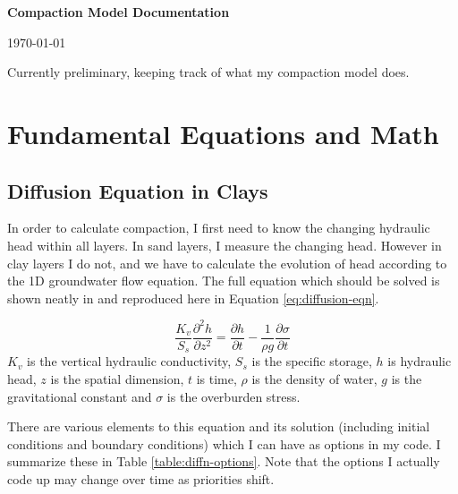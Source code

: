 \documentclass{article}
\begin{document}
\LARGE\textbf{Compaction Model Documentation}
\normalsize

\today
\author{Matt Lees}

\abstract Currently preliminary, keeping track of what my compaction model does.


\tableofcontents

\section{Fundamental Equations and Math}

\subsection{Diffusion Equation in Clays}
\label{sec:diffusion}

In order to calculate compaction, I first need to know the changing hydraulic head within all layers. In sand layers, I measure the changing head. However in clay layers I do not, and we have to calculate the evolution of head according to the 1D groundwater flow equation. The full equation which should be solved is shown neatly in \cite{helm_one-dimensional_1975} and reproduced here in Equation \ref{eq:diffusion-eqn}.

\begin{equation}
\frac{K_v}{S_s} \frac{\partial^2h}{\partial z^2} = \frac{\partial h}{\partial t} - \frac{1}{\rho g} \frac{\partial \sigma}{\partial t}
\label{eq:diffusion-eqn}
\end{equation}
$K_v$ is the vertical hydraulic conductivity, $S_s$ is the specific storage, $ h$ is hydraulic head, $z$ is the spatial dimension, $ t$ is time, $ \rho$ is the density of water, $ g $ is the gravitational constant and $\sigma$ is the overburden stress.

There are various elements to this equation and its solution (including initial conditions and boundary conditions) which I can have as options in my code. I summarize these in Table \ref{table:diffn-options}. Note that the options I actually code up may change over time as priorities shift.
\end{document}
